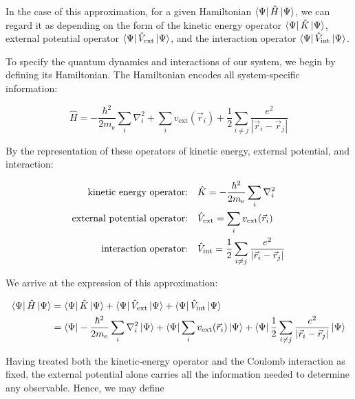 In the case of this approximation, for a given Hamiltonian $\bra{\Psi}\hat{H}\ket{\Psi}$, we can regard it as depending on the form of the kinetic energy operator $\bra{\Psi}\hat{K}\ket{\Psi}$, external potential operator $\bra{\Psi}\hat{V}_\mathrm{ext}\ket{\Psi}$, and the interaction operator $\bra{\Psi}\hat{V}_\mathrm{int}\ket{\Psi}$.

To specify the quantum dynamics and interactions of our system, we begin by defining its Hamiltonian. The Hamiltonian encodes all system‐specific information:

\begin{equation}
    \hat{H}
    = -\frac{\hbar^2}{2m_\mathrm{e}}\sum_i\nabla_i^2
    + \sum_i v_{\mathrm{ext}}(\vec r_i)
    + \frac{1}{2}\sum_{i\neq j}\frac{e^2}{|\vec r_i - \vec r_j|}
\label{hamiltonian}
\end{equation}

By the representation of these operators of kinetic energy, external potential, and interaction:

\begin{align}
\text{kinetic energy operator:\quad} &\hat{K} = -\frac{\hbar^2}{2m_\mathrm{e}}\sum_i\nabla_i^2 \label{kinetic_energy_operator}\\
\text{external potential operator:\quad} &\hat{V}_\mathrm{ext} = \sum_iv_{\mathrm{ext}}(\vec{r}_i) \label{external_potential_operator}\\
\text{interaction operator:\quad} &\hat{V}_\mathrm{int} = \frac{1}{2}\sum_{i\neq j}\frac{e^2}{|\vec{r}_i-\vec{r}_j|}\label{interaction_operator}
\end{align}

We arrive at the expression of this approximation:

\begin{equation}
\begin{aligned}
    \bra{\Psi}\hat{H}\ket{\Psi} &= \bra{\Psi}\hat{K}\ket{\Psi} + \bra{\Psi}\hat{V}_\mathrm{ext}\ket{\Psi} + \bra{\Psi}\hat{V}_\mathrm{int}\ket{\Psi} \\
    &= \bra{\Psi}-\frac{\hbar^2}{2m_\mathrm{e}}\sum_i\nabla_i^2\ket{\Psi}
    + \bra{\Psi}\sum_iv_{\mathrm{ext}}(\vec{r}_i)\ket{\Psi}
    + \bra{\Psi}\frac{1}{2}\sum_{i\neq j}\frac{e^2}{|\vec{r}_i-\vec{r}_j|}\ket{\Psi}
\end{aligned}
\label{approx}
\end{equation}

Having treated both the kinetic‐energy operator and the Coulomb interaction as fixed, the external potential alone carries all the information needed to determine any observable. Hence, we may define

